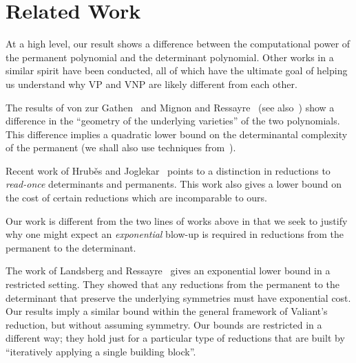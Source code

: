 \section{Related Work}
At a high level, our result shows a difference between the computational power of the permanent polynomial and the determinant polynomial. Other works in a similar spirit have been conducted, all of which have the ultimate goal of helping us understand why VP and VNP are likely different from each other. 

The results of von zur Gathen~\cite{gathen} and Mignon and Ressayre~\cite{mignon2004quadratic} (see also~\cite{cai2010quadratic}) show a difference in the ``geometry of the underlying varieties'' of the two polynomials. This difference implies a quadratic lower bound on the determinantal complexity of the permanent (we shall also use techniques from~\cite{mignon2004quadratic}).

Recent work of Hrub\v{e}s and Joglekar~\cite{HJ} points to a distinction in reductions to \emph{read-once} determinants and permanents. This work also gives a lower bound on the cost of certain reductions which are incomparable to ours. 

Our work is different from the two lines of works above in that we seek to justify why one might expect an \emph{exponential} blow-up is required in reductions from the permanent to the determinant.


The work of Landsberg and Ressayre~\cite{LR} gives an exponential lower bound in a restricted setting. They showed that any reductions from the permanent to the determinant that preserve the underlying symmetries must have exponential cost. Our results imply a similar bound within the general framework of Valiant's reduction, but without assuming symmetry.
Our bounds are restricted in a different way; they hold just for a particular type
of reductions that are built by ``iteratively 
applying a single building block''.